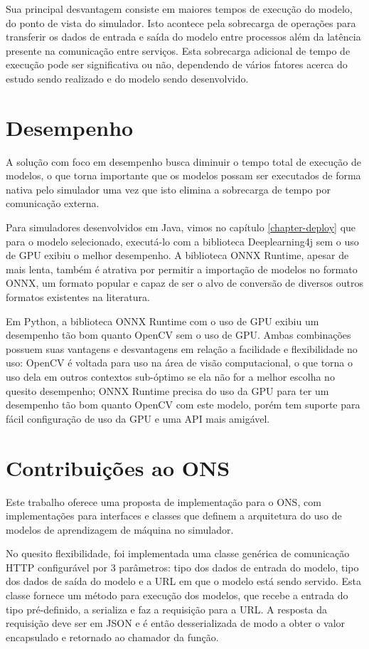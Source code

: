 Sua principal desvantagem consiste em maiores tempos de execução do modelo, do ponto de vista do simulador. Isto acontece pela sobrecarga de operações para transferir os dados de entrada e saída do modelo entre processos além da latência presente na comunicação entre serviços. Esta sobrecarga adicional de tempo de execução pode ser significativa ou não, dependendo de vários fatores acerca do estudo sendo realizado e do modelo sendo desenvolvido.

\section{Desempenho}

A solução com foco em desempenho busca diminuir o tempo total de execução de modelos, o que torna importante que os modelos possam ser executados de forma nativa pelo simulador uma vez que isto elimina a sobrecarga de tempo por comunicação externa.

Para simuladores desenvolvidos em Java, vimos no capítulo \ref{chapter-deploy} que para o modelo selecionado, executá-lo com a biblioteca Deeplearning4j sem o uso de GPU exibiu o melhor desempenho. A biblioteca ONNX Runtime, apesar de mais lenta, também é atrativa por permitir a importação de modelos no formato ONNX, um formato popular e capaz de ser o alvo de conversão de diversos outros formatos existentes na literatura.

Em Python, a biblioteca ONNX Runtime com o uso de GPU exibiu um desempenho tão bom quanto OpenCV sem o uso de GPU. Ambas combinações possuem suas vantagens e desvantagens em relação a facilidade e flexibilidade no uso: OpenCV é voltada para uso na área de visão computacional, o que torna o uso dela em outros contextos sub-óptimo se ela não for a melhor escolha no quesito desempenho; ONNX Runtime precisa do uso da GPU para ter um desempenho tão bom quanto OpenCV com este modelo, porém tem suporte para fácil configuração de uso da GPU e uma API mais amigável.

\section{Contribuições ao ONS}

Este trabalho oferece uma proposta de implementação para o \acrfull{ONS}, com implementações para interfaces e classes que definem a arquitetura do uso de modelos de aprendizagem de máquina no simulador.

No quesito flexibilidade, foi implementada uma classe genérica de comunicação HTTP configurável por 3 parâmetros: tipo dos dados de entrada do modelo, tipo dos dados de saída do modelo e a URL em que o modelo está sendo servido. Esta classe fornece um método para execução dos modelos, que recebe a entrada do tipo pré-definido, a serializa e faz a requisição para a URL. A resposta da requisição deve ser em JSON e é então desserializada de modo a obter o valor encapsulado e retornado ao chamador da função.

